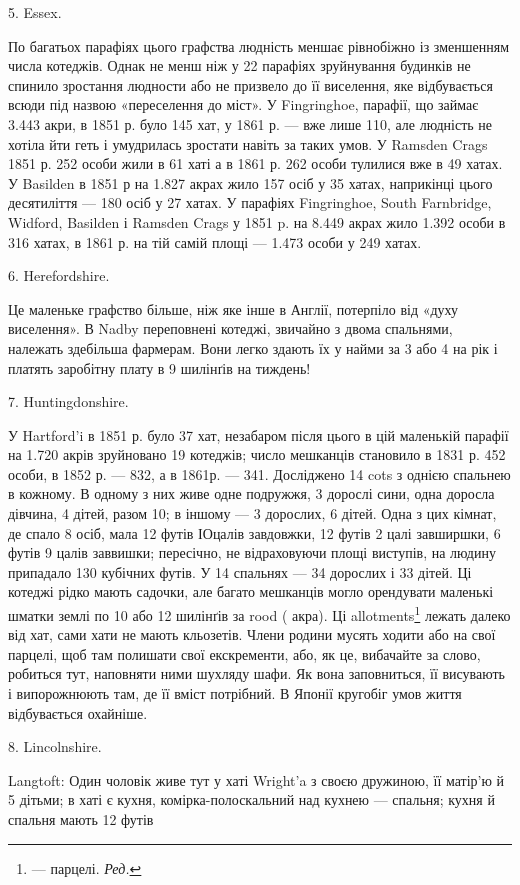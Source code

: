 \parcont{}  %
5. Essex.

По багатьох парафіях цього графства людність меншає рівнобіжно
із зменшенням числа котеджів. Однак не менш ніж у
22 парафіях зруйнування будинків не спинило зростання людности
або не призвело до її виселення, яке відбувається всюди під
назвою «переселення до міст». У Fingringhoe, парафії, що займає
3.443 акри, в 1851 р. було 145 хат, у 1861 р. — вже лише 110, але
людність не хотіла йти геть і умудрилась зростати навіть за
таких умов. У Ramsden Crags 1851 р. 252 особи жили в 61 хаті
а в 1861 р. 262 особи тулилися вже в 49 хатах. У Basilden в 1851 р
на 1.827 акрах жило 157 осіб у 35 хатах, наприкінці цього десятиліття
— 180 осіб у 27 хатах. У парафіях Fingringhoe, South
Farnbridge, Widford, Basilden і Ramsden Crags у 1851 p. на
8.449 акрах жило 1.392 особи в 316 хатах, в 1861 р. на тій самій
площі — 1.473 особи у 249 хатах.

6. Herefordshire.

Це маленьке графство більше, ніж яке інше в Англії, потерпіло
від «духу виселення». В Nadby переповнені котеджі,
звичайно з двома спальнями, належать здебільша фармерам.
Вони легко здають їх у найми за 3 або 4 на рік
і платять заробітну плату в 9 шилінґів на тиждень!

7. Huntingdonshire.

У Hartford’i в 1851 р. було 37 хат, незабаром після цього
в цій маленькій парафії на 1.720 акрів зруйновано 19 котеджів;
число мешканців становило в 1831 р. 452 особи, в 1852 р. — 832,
а в 1861р. — 341. Досліджено 14 cots з однією спальнею в кожному.
В одному з них живе одне подружжя, 3 дорослі сини, одна
доросла дівчина, 4 дітей, разом 10; в іншому — 3 дорослих,
6 дітей. Одна з цих кімнат, де спало 8 осіб, мала 12 футів ІОцалів
завдовжки, 12 футів 2 цалі завширшки, 6 футів 9 цалів заввишки;
пересічно, не відраховуючи площі виступів, на людину припадало
130 кубічних футів. У 14 спальнях — 34 дорослих і 33 дітей. Ці
котеджі рідко мають садочки, але багато мешканців могло орендувати
маленькі шматки землі по 10 або 12 шилінґів за rood ( акра).
Ці allotments\footnote*{
— парцелі. \emph{Ред.}
} лежать далеко від хат, сами хати не мають кльозетів.
Члени родини мусять ходити або на свої парцелі, щоб там
полишати свої екскременти, або, як це, вибачайте за слово, робиться
тут, наповняти ними шухляду шафи. Як вона заповниться,
її висувають і випорожнюють там, де її вміст потрібний. В Японії
кругобіг умов життя відбувається охайніше.

8. Lincolnshire.

Langtoft: Один чоловік живе тут у хаті Wright’a з своєю дружиною,
її матір’ю й 5 дітьми; в хаті є кухня, комірка-полоскальний
над кухнею — спальня; кухня й спальня мають 12 футів

\parbreak{}  %
